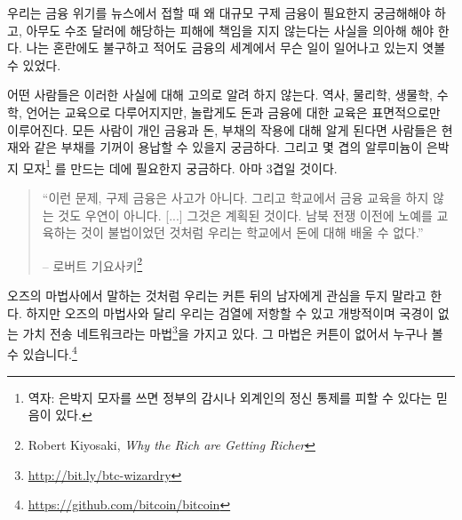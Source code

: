 \newpage

우리는 금융 위기를 뉴스에서 접할 때 왜 대규모 구제 금융이 필요한지 궁금해해야 하고, 아무도 수조 달러에 해당하는
피해에 책임을 지지 않는다는 사실을 의아해 해야 한다. 
나는 혼란에도 불구하고 적어도 금융의 세계에서 무슨 일이 일어나고 있는지 엿볼 수 있었다.

어떤 사람들은 이러한 사실에 대해 고의로 알려 하지 않는다. 
역사, 물리학, 생물학, 수학, 언어는 교육으로 다루어지지만, 
놀랍게도 돈과 금융에 대한 교육은 표면적으로만 이루어진다. 
모든 사람이 개인 금융과 돈, 부채의 작용에 대해 알게 된다면 사람들은 현재와 같은 부채를 기꺼이 용납할 수 있을지 궁금하다. 
그리고 몇 겹의 알루미늄이 은박지 모자\footnote{역자: 은박지 모자를 쓰면 정부의 감시나 외계인의 정신 통제를 피할 수 있다는 믿음이 있다.}
를 만드는 데에 필요한지 궁금하다.
아마 3겹일 것이다.

\begin{quotation}\begin{samepage}
		\enquote{이런 문제, 구제 금융은 사고가 아니다. 그리고 학교에서 금융 교육을 하지 않는 것도 우연이 아니다. [...] 그것은 계획된 것이다.
			남북 전쟁 이전에 노예를 교육하는 것이 불법이었던 것처럼 우리는 학교에서 돈에 대해 배울 수 없다.}
		\begin{flushright} -- 로버트 기요사키\footnote{Robert Kiyosaki, \textit{Why the Rich
					are Getting Richer}\cite{robert-kiyosaki}}
\end{flushright}\end{samepage}\end{quotation}


오즈의 마법사에서 말하는 것처럼 우리는 커튼 뒤의 남자에게 관심을 두지 말라고 한다. 
하지만 오즈의 마법사와 달리
우리는 검열에 저항할 수 있고 개방적이며 국경이 없는 가치 전송 네트워크라는 마법\footnote{\url{http://bit.ly/btc-wizardry}}을 가지고 있다.
그 마법은 커튼이 없어서 누구나 볼 수 있습니다.\footnote{\url{https://github.com/bitcoin/bitcoin}}

